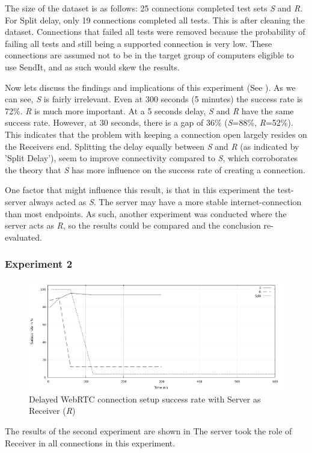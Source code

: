 The size of the dataset is as follows: 25 connections completed test sets \textit{S} and \textit{R}. For Split delay, only 19 connections completed all tests. This is after cleaning the dataset. Connections that failed all tests were removed because the probability of failing all tests and still being a supported connection is very low. These connections are assumed not to be in the target group of computers eligible to use SendIt, and as such would skew the results.

Now lets discuss the findings and implications of this experiment (See ). As we can see, \textit{S} is fairly irrelevant. Even at 300 seconds (5 minutes) the success rate is 72\%. \textit{R} is much more important. At a 5 seconds delay, \textit{S} and \textit{R} have the same success rate. However, at 30 seconds, there is a gap of 36\% (\textit{S}=88\%, \textit{R}=52\%). This indicates that the problem with keeping a connection open largely resides on the Receivers end. Splitting the delay equally between \textit{S} and \textit{R} (as indicated by 'Split Delay'), seem to improve connectivity compared to \textit{S}, which corroborates the theory that \textit{S} has more influence on the success rate of creating a connection.

One factor that might influence this result, is that in this experiment the test-server always acted as \textit{S}. The server may have a more stable internet-connection than most endpoints. As such, another experiment was conducted where the server acts as \textit{R}, so the results could be compared and the conclusion re-evaluated.
%
%
\subsubsection*{Experiment 2}
%
\begin{figure}[th]
  \centering
  \includegraphics[width=\textwidth]{Figures/Exp2_res}
  \decoRule
  \caption[Experiment 2]{Delayed WebRTC connection setup success rate with Server as Receiver (\textit{R})}
  \label{fig:exp2}
\end{figure}
%
The results of the second experiment are shown in  The server took the role of Receiver in all connections in this experiment.

